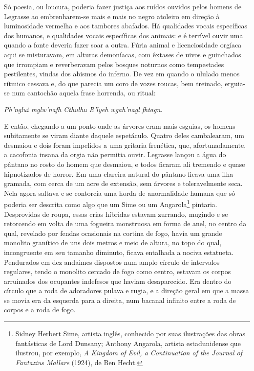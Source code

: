 Só poesia, ou loucura, poderia fazer justiça aos ruídos ouvidos pelos
homens de Legrasse ao embrenharem-se mais e mais no negro atoleiro em
direção à luminosidade vermelha e aos tambores abafados. Há qualidades
vocais específicas dos humanos, e qualidades vocais específicas dos
animais: e é terrível ouvir uma quando a fonte deveria fazer soar a
outra. Fúria animal e licenciosidade orgíaca aqui se misturavam, em
alturas demoníacas, com êxtases de uivos e guinchados que irrompiam e
reverberavam pelos bosques noturnos como tempestades pestilentes, vindas
dos abismos do inferno. De vez em quando o ululado menos rítmico cessava
e, do que parecia um coro de vozes roucas, bem treinado, erguia-se num
cantochão aquela frase horrenda, ou ritual:

\emph{Ph'nglui mglw'nafh Cthulhu R'lyeh wgah'nagl fhtagn.}

E então, chegando a um ponto onde as árvores eram mais esguias, os
homens subitamente se viram diante daquele espetáculo. Quatro deles
cambalearam, um desmaiou e dois foram impelidos a uma gritaria
frenética, que, afortunadamente, a cacofonia insana da orgia não
permitia ouvir. Legrasse lançou a água do pântano no rosto do homem que
desmaiou, e todos ficaram ali tremendo e quase hipnotizados de horror.
Em uma clareira natural do pântano ficava uma ilha gramada, com 
cerca de um acre de extensão, sem árvores e toleravelmente seca. Nela
agora saltava e se contorcia uma horda de anormalidade humana que só
poderia ser descrita como algo que um Sime ou um Angarola\footnote{Sidney
  Herbert Sime, artista inglês, conhecido por suas
  ilustrações das obras fantásticas de Lord Dunsany; Anthony
  Angarola, artista estadunidense que ilustrou, por exemplo,
  \emph{A Kingdom of Evil, a Continuation of the Journal of Fantazius
  Mallare} (1924), de Ben Hecht.} pintaria. Desprovidas de
roupa, essas crias híbridas estavam zurrando, mugindo e se retorcendo em
volta de uma fogueira monstruosa em forma de anel, no centro da qual,
revelado por fendas ocasionais na cortina de fogo, havia um grande
monolito granítico de uns dois metros e meio de altura, no topo do qual,
incongruente em seu tamanho diminuto, ficava entalhada a nociva
estatueta. Pendurados em dez andaimes dispostos num amplo círculo de
intervalos regulares, tendo o monolito cercado de fogo como centro,
estavam os corpos arruinados dos ocupantes indefesos que haviam
desaparecido. Era dentro do círculo que a roda de adoradores pulava e
rugia, e a direção geral em que a massa se movia era da esquerda para a
direita, num bacanal infinito entre a roda de corpos e a roda de fogo.

